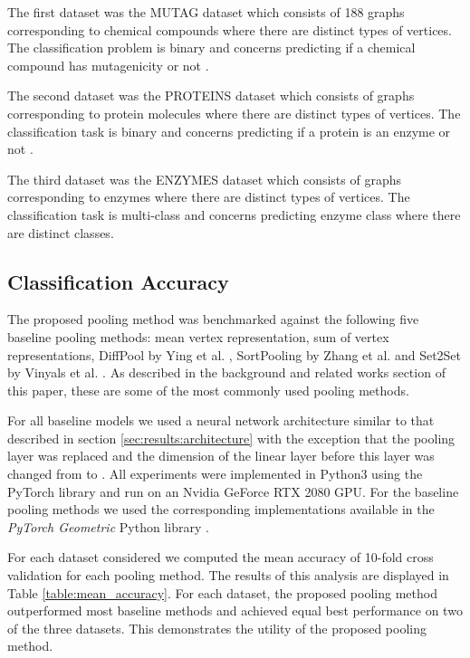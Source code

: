 \documentclass[runningheads]{llncs}
\begin{document}
The first dataset was the MUTAG dataset which consists of 188 graphs corresponding to chemical compounds where there are  distinct types of vertices. The classification problem is binary and concerns predicting if a chemical compound has mutagenicity or not \cite{debnath1991}.

The second dataset was the PROTEINS dataset which consists of  graphs corresponding to protein molecules where there are  distinct types of vertices. The classification task is binary and concerns predicting if a protein is an enzyme or not \cite{borgwardt2005}.

The third dataset was the ENZYMES dataset which consists of  graphs corresponding to enzymes where there are  distinct types of vertices. The classification task is multi-class and concerns predicting enzyme class where there are  distinct classes.

\subsection{Classification Accuracy}
\label{sec:results:classification_accuracy}
The proposed pooling method was benchmarked against the following five baseline pooling methods: mean vertex representation, sum of vertex representations, DiffPool by Ying et al. \cite{ying2018}, SortPooling by Zhang et al. \cite{zhang2018} and Set2Set by Vinyals et al. \cite{vinyals2015}. As described in the background and related works section of this paper, these are some of the most commonly used pooling methods.

For all baseline models we used a neural network architecture similar to that described in section \ref{sec:results:architecture} with the exception that the pooling layer was replaced and the dimension of the linear layer before this layer was changed from  to . All experiments were implemented in Python3 using the PyTorch library \cite{paszke2017automatic} and run on an Nvidia GeForce RTX 2080 GPU. For the baseline pooling methods we used the corresponding implementations available in the \textit{PyTorch Geometric} Python library \cite{Fey/Lenssen/2019}. 

For each dataset considered we computed the mean accuracy of 10-fold cross validation for each pooling method. The results of this analysis are displayed in Table \ref{table:mean_accuracy}. For each dataset, the proposed pooling method outperformed most baseline methods and achieved equal best performance on two of the three datasets. This demonstrates the utility of the proposed pooling method.
\end{document}
